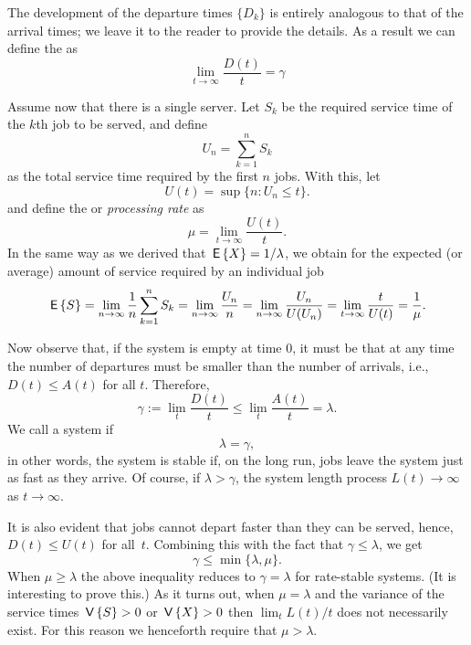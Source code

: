 The development of the departure times $\{D_k\}$ is entirely analogous
to that of the arrival times; we leave it to the reader to provide the
details. As a result we can define the  as
\begin{equation}\label{eq:28}
  \lim_{t\to\infty} \frac{D(t)}t = \gamma
\end{equation}

Assume now that there is a single server. Let $S_k$ be the required
service time of the $k$th job to be served, and define
\begin{equation*}
U_n = \sum_{k=1}^n S_k
\end{equation*}
as the total service time required by the first $n$ jobs. With this,
let 
\begin{equation*}
  U(t) = \sup\{n: U_n \leq t\}.
\end{equation*}
and  define the  or \emph{processing rate} as
\begin{equation*}
  \mu = \lim_{t\to\infty} \frac{U(t)}t.
\end{equation*}
In the same way as we derived that $\,\mathsf{E}\left\{X\right\}= 1/\lambda$, we obtain for
the expected (or average) amount of service required by an individual
job
\begin{equation*}
  \,\mathsf{E}\left\{S\right\} = \lim_{n\to\infty} \frac 1 n \sum_{k=1}^n S_k = \lim_{n\to\infty} \frac{U_n}{n} = \lim_{n\to\infty} \frac{U_n}{U(U_n)} = \lim_{t\to\infty} \frac t{U(t)} = \frac 1 \mu.
\end{equation*}

Now observe that, if the system is empty at time $0$, it must be that
at any time the number of departures must be smaller than the number
of arrivals, i.e., $D(t) \leq A(t)$ for all $t$. Therefore,
\begin{equation}\label{eq:26}
\gamma :=   \lim_t \frac{D(t)}t \leq \lim_t \frac{A(t)}t = \lambda.
\end{equation}
We call a system  if
\begin{equation*}
  \lambda = \gamma,
\end{equation*}
in other words, the system is stable if, on the long run, jobs leave
the system just as fast as they arrive. Of course, if
$\lambda > \gamma$, the system length process $L(t) \to \infty$ as
$t\to \infty$.

It is also evident that jobs cannot depart faster than they can be
served, hence, $D(t) \leq U(t)$ for all~$t$. Combining this with the
fact that $\gamma \leq \lambda$, we get
\begin{equation*}
  \gamma \leq \min\{\lambda, \mu\}.
\end{equation*}
When $\mu \geq \lambda$ the above inequality reduces to
$\gamma = \lambda$ for rate-stable systems. (It is interesting to
prove this.) As it turns out, when $\mu = \lambda$ and the variance of
the service times $\,\mathsf{V}\left\{S\right\} > 0$ or $\,\mathsf{V}\left\{X\right\} >0$ then $\lim_t L(t)/t$
does not necessarily exist. For this reason we henceforth require that
$\mu > \lambda$.

